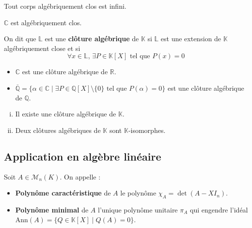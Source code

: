 	\begin{proposition}
		Tout corps algébriquement clos est infini.
	\end{proposition}

	\begin{theorem}
		$\mathbb{C}$ est algébriquement clos.
	\end{theorem}

	\begin{definition}
		On dit que $\mathbb{L}$ est une \textbf{clôture algébrique} de $\mathbb{K}$ si $\mathbb{L}$ est une extension de $\mathbb{K}$ algébriquement close et si
		\[ \forall x \in \mathbb{L}, \, \exists P \in \mathbb{K}[X] \text{ tel que } P(x) = 0 \]
	\end{definition}

	\begin{example}
		\begin{itemize}
			\item $\mathbb{C}$ est une clôture algébrique de $\mathbb{R}$.
			\item $\overline{\mathbb{Q}} = \{ \alpha \in \mathbb{C} \mid \exists P \in \mathbb{Q}[X] \setminus \{ 0 \} \text{ tel que } P(\alpha) = 0 \}$ est une clôture algébrique de $\mathbb{Q}$.
		\end{itemize}
	\end{example}

	\begin{theorem}[Steinitz]
		\begin{enumerate}[(i)]
			\item Il existe une clôture algébrique de $\mathbb{K}$.
			\item Deux clôtures algébriques de $\mathbb{K}$ sont $\mathbb{K}$-isomorphes.
		\end{enumerate}
	\end{theorem}

	\subsection{Application en algèbre linéaire}


	\begin{definition}
		Soit $A \in \mathcal{M}_n(K)$. On appelle :
		\begin{itemize}
			\item \textbf{Polynôme caractéristique} de $A$ le polynôme $\chi_A = \det(A - XI_n)$.
			\item \textbf{Polynôme minimal} de $A$ l'unique polynôme unitaire $\pi_A$ qui engendre l'idéal $\mathrm{Ann}(A) = \{ Q \in \mathbb{K}[X] \mid Q(A) = 0 \}$.
		\end{itemize}
	\end{definition}

